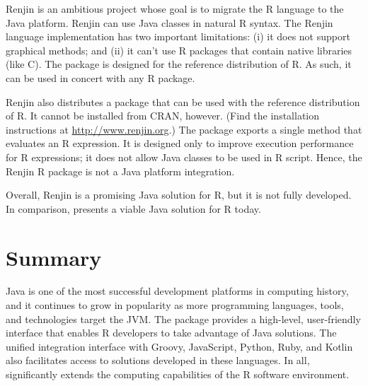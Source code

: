 Renjin \citep{renjin} is an ambitious project whose goal is to migrate the R language to the Java platform. Renjin can use Java classes in natural R syntax. The Renjin language implementation has two important limitations: (i) it does not support graphical methods; and (ii) it can't use R packages that contain native libraries (like C). The  package is designed for the reference distribution of R. As such, it can be used in concert with any R package.

Renjin also distributes a package that can be used with the reference distribution of R. It cannot be installed from CRAN, however. (Find the installation instructions at \url{http://www.renjin.org}.) The package exports a single method that evaluates an R expression. It is designed only to improve execution performance for R expressions; it does not allow Java classes to be used in R script. Hence, the Renjin R package is not a Java platform integration.

Overall, Renjin is a promising Java solution for R, but it is not fully developed. In comparison,  presents a viable Java solution for R today.

\section{Summary}

Java is one of the most successful development platforms in computing history, and it continues to grow in popularity as more programming languages, tools, and technologies target the JVM. The  package provides a high-level, user-friendly interface that enables R developers to take advantage of Java solutions. The unified integration interface with Groovy, JavaScript, Python, Ruby, and Kotlin also facilitates access to solutions developed in these languages. In all,  significantly extends the computing capabilities of the R software environment.



\address{Floid R. Gilbert\\
    Department of Statistics\\
    Brigham Young University\\
    Provo, UT 84602\\
    USA\\}

\address{David B. Dahl\\
    Department of Statistics\\
    Brigham Young University\\
    Provo, UT 84602\\
    USA\\}

